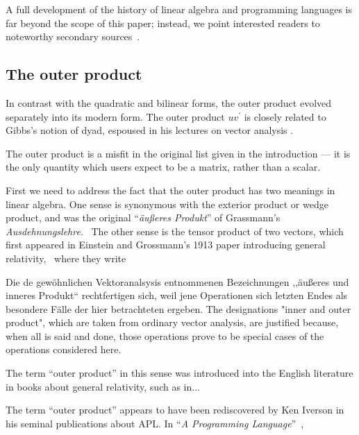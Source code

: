 A full development of the history of linear algebra and programming languages is
far beyond the scope of this paper; instead, we point interested readers to
noteworthy secondary sources~\cite{Parshall1985,Kleiner2007,Higham2009}.



\subsection{The outer product}


In contrast with the quadratic and bilinear forms, the outer product evolved separately into its modern form. The outer product $u v^\prime$ is closely related to Gibbs's notion of dyad, espoused in his lectures on vector analysis \cite{Gibbs1881,Wilson1901}.

The outer product is a misfit in the original list given in the introduction --- it is the only quantity which users expect to be a matrix, rather than a scalar.

First we need to address the fact that the outer product has two meanings in linear algebra. One sense is synonymous with the exterior product or wedge product, and was the original ``\textit{äußeres Produkt}'' of Grassmann's \textit{Ausdehnungslehre}.~\cite{Grassmann1844,Grassmann1862,Grassmann1995,Grassmann2000} The other sense is the tensor product of two vectors, which first appeared in Einstein and Grossmann's 1913 paper introducing general relativity,~\cite{Einstein1913} where they write

Die de gewöhnlichen Vektoranalsysis entnommenen Bezeichnungen ,,äußeres und inneres Produkt`` rechtfertigen sich, weil jene Operationen sich letzten Endes als besondere Fälle der hier betrachteten ergeben. The designations "inner and outer product", which are taken from ordinary vector analysis, are justified because, when all is said and done, those operations prove to be special cases of the operations considered here.~\cite[T. II, p. 26]{Einstein1913,Einstein1996}



The term ``outer product'' in this sense was introduced into the English literature in books about general relativity, such as in...

The term ``outer product'' appears to have been rediscovered by Ken Iverson in his seminal publications about APL. In ``\textit{A Programming Language}''~\cite{Iverson1962book},

